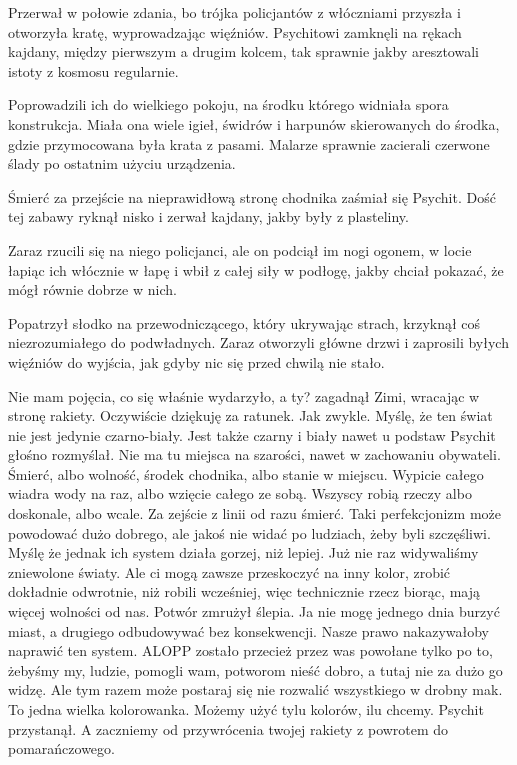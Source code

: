 Przerwał w połowie zdania, bo trójka policjantów z włóczniami przyszła i otworzyła kratę, wyprowadzając więźniów.
Psychitowi zamknęli na rękach kajdany, między pierwszym a drugim kolcem, tak sprawnie jakby aresztowali istoty z kosmosu regularnie.

Poprowadzili ich do wielkiego pokoju, na środku którego widniała spora konstrukcja.
Miała ona wiele igieł, świdrów i harpunów skierowanych do środka, gdzie przymocowana była krata z pasami.
Malarze sprawnie zacierali czerwone ślady po ostatnim użyciu urządzenia.

\begin{dialogue}
\ds{} Śmierć za przejście na nieprawidłową stronę chodnika \dm{} zaśmiał się Psychit. \dm{} Dość tej zabawy \dm{} ryknął nisko i zerwał kajdany, jakby były z plasteliny.
\end{dialogue}

Zaraz rzucili się na niego policjanci, ale on podciął im nogi ogonem, w locie łapiąc ich włócznie w łapę i wbił z całej siły w podłogę, 
jakby chciał pokazać, że mógł równie dobrze w nich.

Popatrzył słodko na przewodniczącego, który ukrywając strach, krzyknął coś niezrozumiałego do podwładnych.
Zaraz otworzyli główne drzwi i zaprosili byłych więźniów do wyjścia, jak gdyby nic się przed chwilą nie stało.

\divider{}

\begin{dialogue}
\ds{} Nie mam pojęcia, co się właśnie wydarzyło, a ty? \dm{} zagadnął Zimi, wracając w stronę rakiety. \dm{} Oczywiście dziękuję za ratunek. Jak zwykle.
\ds{} Myślę, że ten świat nie jest jedynie czarno-biały. Jest także czarny i biały nawet u podstaw \dm{} Psychit głośno rozmyślał. \dm{} 
Nie ma tu miejsca na szarości, nawet w zachowaniu obywateli. Śmierć, albo wolność, środek chodnika, albo stanie w miejscu. 
Wypicie całego wiadra wody na raz, albo wzięcie całego ze sobą. Wszyscy robią rzeczy albo doskonale, albo wcale. Za zejście z linii od razu śmierć.
\ds{} Taki perfekcjonizm może powodować dużo dobrego, ale jakoś nie widać po ludziach, żeby byli szczęśliwi. Myślę że jednak ich system działa gorzej, niż lepiej.
\ds{} Już nie raz widywaliśmy zniewolone światy. Ale ci mogą zawsze przeskoczyć na inny kolor, zrobić dokładnie odwrotnie, niż robili wcześniej, więc technicznie rzecz biorąc, mają więcej wolności od nas.
\dm{} Potwór zmrużył ślepia. \dm{} Ja nie mogę jednego dnia burzyć miast, a drugiego odbudowywać bez konsekwencji.
\ds{} Nasze prawo nakazywałoby naprawić ten system. ALOPP zostało przecież przez was powołane tylko po to, żebyśmy my, ludzie, pomogli wam, potworom nieść dobro, a tutaj nie za dużo go widzę. 
Ale tym razem może postaraj się nie rozwalić wszystkiego w drobny mak.
\ds{} To jedna wielka kolorowanka. Możemy użyć tylu kolorów, ilu chcemy. \dm{} Psychit przystanął. \dm{} A zaczniemy od przywrócenia twojej rakiety z powrotem do pomarańczowego.
\end{dialogue}

